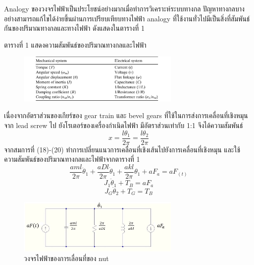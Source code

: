 \documentclass[11pt,a4paper]{article}
\begin{document}
Analogy ของวงจรไฟฟ้าเป็นประโยชน์อย่างมากเมื่อทำการวิเคราะห์ระบบทางกล ปัญหาทางกลบางอย่างสามารถแก้ไขได้ง่ายขึ้นผ่านการเปรียบเทียบทางไฟฟ้า analogy ที่ใช้งานทั่วไปมีเป็นสิ่งที่สัมพันธ์กันของปริมาณทางกลและทางไฟฟ้า ดังแสดงในตารางที่ 1 

\begin{center} 
    ตารางที่ 1 แสดงความสัมพันธ์ของปริมาณทางกลและไฟฟ้า
    \end{center} 
\begin{figure}[h!]
    \begin{center}
        \includegraphics[width=0.7\textwidth]{analogy_lx.png}
    \end{center}
    \label{analogy_lx}
\end{figure}
เนื่องจากอัตราส่วนของเกียร์ของ gear train และ bevel gears ที่ใช้ในการส่งการเคลื่อนที่เชิงหมุนจาก lead screw ไป ยังโรเตอร์ของเครื่องกำเนิดไฟฟ้า มีอัตราส่วนเท่ากับ 1:1 จึงได้ความสัมพันธ์ 
\begin{equation}
    x = \frac{l\theta_{1}}{2\pi} = \frac{l\theta_{2}}{2\pi} 
\end{equation}
จากสมการที่ (18)-(20) ทำการเปลี่ยนแนวการเคลื่อนที่เชิงเส้นไปยังการเคลื่อนที่เชิงหมุน และใช้ความสัมพันธ์ของปริมาณทางกลและไฟฟ้าจากตารางที่ 1 
\begin{equation}
   \frac{aml}{2\pi}\ddot{\theta}_{1} + \frac{aDl}{2\pi}\dot{\theta}_{1} + \frac{akl}{2\pi}\theta_{1} + aF_{a} = aF_(t)
\end{equation}
\begin{equation}
    J_{1}\ddot{\theta}_{1} + T_{B} = aF_{a}
 \end{equation}
 \begin{equation}
    J_{G}\ddot{\theta}_{2} + T_{G} = T_{B}
 \end{equation}
 \begin{figure}[!htb]
    \begin{center}
        \includegraphics[width=0.7\textwidth]{cir1lx.jpeg}
    \end{center}
    \caption{วงจรไฟฟ้าของการเลื่อนที่ของ nut}
    \label{cir1lx}
\end{figure}
\end{document}
